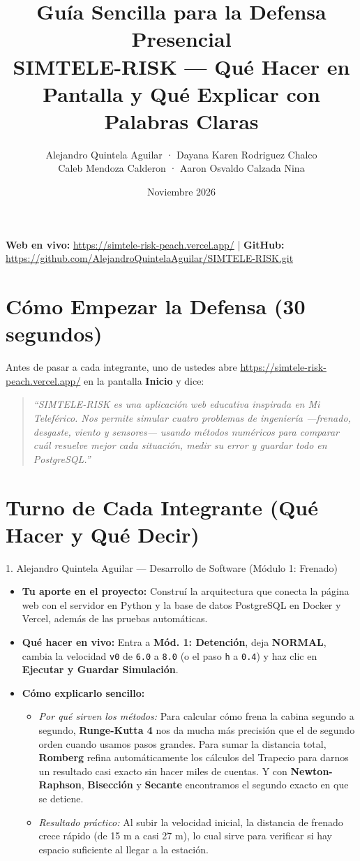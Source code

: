 \documentclass[11pt,a4paper]{article}
\title{\textbf{Guía Sencilla para la Defensa Presencial} \\
\large SIMTELE-RISK — Qué Hacer en Pantalla y Qué Explicar con Palabras Claras}
\author{Alejandro Quintela Aguilar · Dayana Karen Rodriguez Chalco \\
Caleb Mendoza Calderon · Aaron Osvaldo Calzada Nina}
\date{Noviembre 2026}
\begin{document}
\maketitle

\noindent\textbf{Web en vivo:} \url{https://simtele-risk-peach.vercel.app/} \quad | \quad
\textbf{GitHub:} \url{https://github.com/AlejandroQuintelaAguilar/SIMTELE-RISK.git}

\section{Cómo Empezar la Defensa (30 segundos)}
Antes de pasar a cada integrante, uno de ustedes abre \url{https://simtele-risk-peach.vercel.app/} en la pantalla \textbf{Inicio} y dice:
\begin{quote}
\textit{``SIMTELE-RISK es una aplicación web educativa inspirada en Mi Teleférico. Nos permite simular cuatro problemas de ingeniería —frenado, desgaste, viento y sensores— usando métodos numéricos para comparar cuál resuelve mejor cada situación, medir su error y guardar todo en PostgreSQL.''}
\end{quote}

\section{Turno de Cada Integrante (Qué Hacer y Qué Decir)}

\begin{tarjeta}{1. Alejandro Quintela Aguilar — Desarrollo de Software (Módulo 1: Frenado)}
\begin{itemize}[noitemsep]
    \item \textbf{Tu aporte en el proyecto:} Construí la arquitectura que conecta la página web con el servidor en Python y la base de datos PostgreSQL en Docker y Vercel, además de las pruebas automáticas.
    \item \textbf{Qué hacer en vivo:} Entra a \textbf{Mód. 1: Detención}, deja \textbf{NORMAL}, cambia la velocidad \texttt{v0} de \texttt{6.0} a \texttt{8.0} (o el paso \texttt{h} a \texttt{0.4}) y haz clic en \textbf{Ejecutar y Guardar Simulación}.
    \item \textbf{Cómo explicarlo sencillo:}
    \begin{itemize}[noitemsep]
        \item \textit{Por qué sirven los métodos:} Para calcular cómo frena la cabina segundo a segundo, \textbf{Runge-Kutta 4} nos da mucha más precisión que el de segundo orden cuando usamos pasos grandes. Para sumar la distancia total, \textbf{Romberg} refina automáticamente los cálculos del Trapecio para darnos un resultado casi exacto sin hacer miles de cuentas. Y con \textbf{Newton-Raphson}, \textbf{Bisección} y \textbf{Secante} encontramos el segundo exacto en que se detiene.
        \item \textit{Resultado práctico:} Al subir la velocidad inicial, la distancia de frenado crece rápido (de 15 m a casi 27 m), lo cual sirve para verificar si hay espacio suficiente al llegar a la estación.
    \end{itemize}
\end{itemize}
\end{tarjeta}
\end{document}
